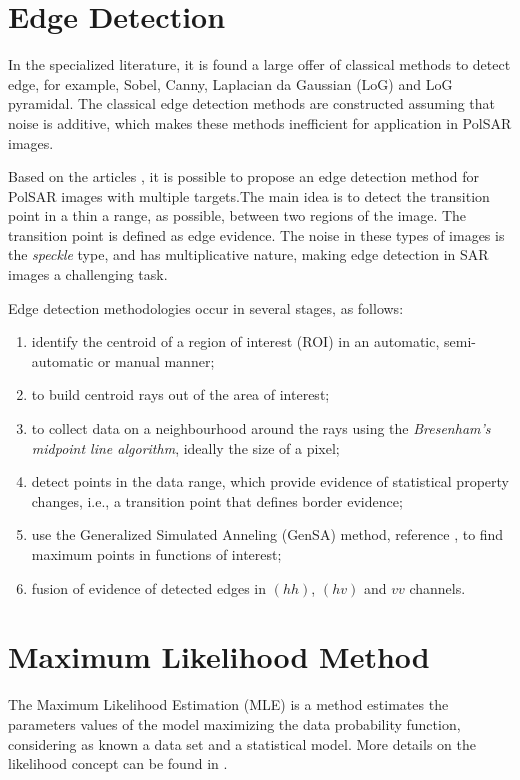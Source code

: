\documentclass[conference]{IEEEtran}
\begin{document}
{{{{\section{Edge Detection}\label{sec_04}
In the specialized literature, it is found a large offer of classical methods to detect edge, for example, Sobel, Canny, Laplacian da Gaussian (LoG) and LoG pyramidal. The classical edge detection methods are constructed assuming that noise is additive, which makes these methods inefficient for application in PolSAR images.

Based on the articles \cite{nhfc, gmbf}, it is possible to propose an edge detection method for PolSAR images with multiple targets.The main idea is to detect the transition point in a thin a range, as possible, between two regions of the image. The transition point is defined as edge evidence. The noise in these types of images is the \textit{speckle} type, and has multiplicative nature, making edge detection in SAR images a challenging task.

Edge detection methodologies occur in several stages, as follows:
\begin{enumerate}
	\item identify the centroid of a region of interest (ROI) in an automatic, semi-automatic or manual manner;
	\item to build centroid rays out of the area of interest;
	\item to collect data on a neighbourhood around the rays using the {\it Bresenham's midpoint line algorithm}, ideally the size of a pixel;
	\item detect points in the data range, which provide evidence of statistical property changes, i.e., a transition point that defines border evidence;
	\item use the Generalized Simulated Anneling (GenSA) method, reference \cite{xgsh}, to find maximum points in functions of interest;
	\item fusion of evidence of detected edges in $(hh)$, $(hv)$ and $vv$ channels.
\end{enumerate}

\section{Maximum Likelihood Method}\label{sec_05}
The Maximum Likelihood Estimation (MLE) is a method estimates the parameters values of the model maximizing the data probability function, considering as known a data set and a statistical model. More details on the likelihood concept can be found in \cite{nhfc, gmbf}.

}}}}
\end{document}
